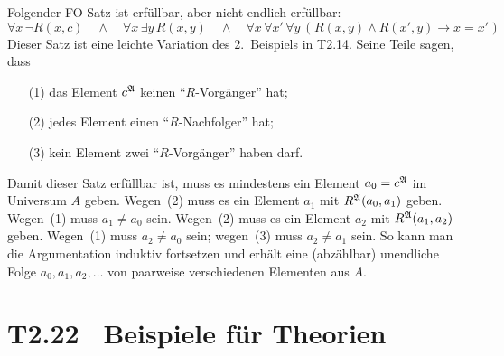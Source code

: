 \documentclass[fontsize=11pt, twoside=false, numbers=autoenddot]{scrbook}
\begin{document}
Folgender FO-Satz ist erfüllbar, aber nicht endlich erfüllbar:
%
\[
  \forall x \, \neg R(x,c)
  \quad\land\quad
  \forall x \, \exists y \, R(x,y)
  \quad\land\quad
  \forall x\, \forall x'\, \forall y \, \;\!\big(\;\! R(x,y) \wedge R(x',y) \rightarrow  x=x' \;\!\big)
\]
%
Dieser Satz ist eine leichte Variation des 2.\ Beispiels in T2.14.
Seine Teile sagen, dass 
\begin{enumerate}
  \item[(1)]
    das Element $c^\mathfrak{A}$ keinen "`$R$-Vorgänger"' hat;
  \item[(2)]
    jedes Element einen "`$R$-Nachfolger"' hat;
  \item[(3)]
    kein Element zwei "`$R$-Vorgänger"' haben darf.
\end{enumerate}
Damit dieser Satz erfüllbar ist, muss es mindestens ein Element $a_0 = c^\mathfrak{A}$ im Universum $A$ geben.
Wegen~(2) muss es ein Element $a_1$ mit $R^\mathfrak{A}(a_0,a_1)$ geben.
Wegen~(1) muss $a_1 \neq a_0$ sein.
Wegen~(2) muss es ein Element $a_2$ mit $R^\mathfrak{A}(a_1,a_2)$ geben.
Wegen~(1) muss $a_2 \neq a_0$ sein;
wegen~(3) muss $a_2 \neq a_1$ sein.
So kann man die Argumentation induktiv fortsetzen und erhält eine (abzählbar) unendliche Folge
$a_0,a_1,a_2,\dots$ von paarweise verschiedenen Elementen aus $A$.

\section*{T2.22~ Beispiele für Theorien}
\end{document}
